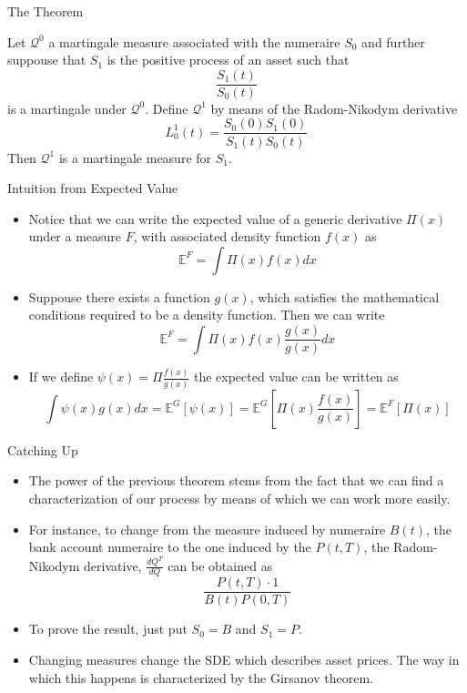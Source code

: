 \documentclass{beamer}
\begin{document}
\begin{frame}{The Theorem}
\begin{block}{}
Let $\mathcal{Q}^0$ a martingale measure associated with the numeraire $S_0$ and further suppouse that $S_1$ is the positive process of an asset such that
\begin{equation}
\frac{S_1(t)}{S_0(t)}
\end{equation}
is a martingale under $\mathcal{Q}^0$. Define $\mathcal{Q}^1$ by means of the Radom-Nikodym derivative
		\begin{equation}
	L_0^1(t) = \frac{S_0(0)S_1(0)}{S_1(t)S_0(t)}
\end{equation}
Then $\mathcal{Q}^1$ is a martingale measure for $S_1$.
\end{block}
\end{frame}

\begin{frame}{Intuition from Expected Value}
\begin{itemize}
	\item Notice that we can write the expected value of a generic derivative $\Pi(x)$ under a measure $F$, with associated density function $f(x)$ as
	\begin{equation}
		\mathbb{E}^{F}=\int\Pi(x)f(x)dx
	\end{equation}
	\item Suppouse there exists a function $g(x)$, which satisfies the mathematical conditions required to be a density function. Then we can write
	\begin{equation}
		\mathbb{E}^{F}=\int\Pi(x)f(x)\frac{g(x)}{g(x)}dx
	\end{equation}
	\item If we define $\psi(x)=\Pi\frac{f(x)}{g(x)}$ the expected value can be written as 
	\begin{equation}
		\int\psi(x)g(x)dx=\mathbb{E}^G\left[\psi(x)\right]=\mathbb{E}^G\left[\Pi(x)\frac{f(x)}{g(x)}\right]=\mathbb{E}^F\left[\Pi(x)\right]
	\end{equation}
\end{itemize}
\end{frame}

\begin{frame}{Catching Up}
\begin{itemize}
	\item The power of the previous theorem stems from the fact that we can find a characterization of our process by means of which we can work more easily.
	\item For instance, to change from the measure induced by numeraire $B(t)$, the bank account numeraire to the one induced by the $P(t,T)$, the Radom-Nikodym derivative, $\frac{dQ^T}{dQ}$ can be obtained as
	\begin{equation}
		\frac{P(t,T) \cdot 1}{B(t)P(0,T)}
	\end{equation}
	\item To prove the result, just put $S_0=B$ and $S_1=P$.
	\item Changing measures change the SDE which describes asset prices. The way in which this happens is characterized by the Girsanov theorem.
\end{itemize}
\end{frame}
\end{document}
